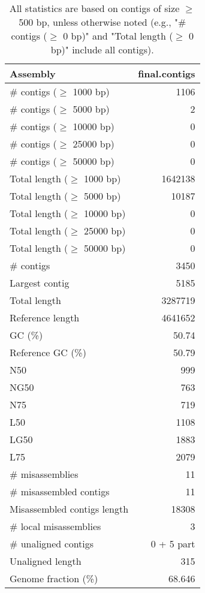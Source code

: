 \documentclass[12pt,a4paper]{article}
\begin{document}
\begin{table}[ht]
\begin{center}
\caption{All statistics are based on contigs of size $\geq$ 500 bp, unless otherwise noted (e.g., "\# contigs ($\geq$ 0 bp)" and "Total length ($\geq$ 0 bp)" include all contigs).}
\begin{tabular}{|l*{1}{|r}|}
\hline
Assembly & final.contigs \\ \hline
\# contigs ($\geq$ 1000 bp) & 1106 \\ \hline
\# contigs ($\geq$ 5000 bp) & 2 \\ \hline
\# contigs ($\geq$ 10000 bp) & 0 \\ \hline
\# contigs ($\geq$ 25000 bp) & 0 \\ \hline
\# contigs ($\geq$ 50000 bp) & 0 \\ \hline
Total length ($\geq$ 1000 bp) & 1642138 \\ \hline
Total length ($\geq$ 5000 bp) & 10187 \\ \hline
Total length ($\geq$ 10000 bp) & 0 \\ \hline
Total length ($\geq$ 25000 bp) & 0 \\ \hline
Total length ($\geq$ 50000 bp) & 0 \\ \hline
\# contigs & 3450 \\ \hline
Largest contig & 5185 \\ \hline
Total length & 3287719 \\ \hline
Reference length & 4641652 \\ \hline
GC (\%) & 50.74 \\ \hline
Reference GC (\%) & 50.79 \\ \hline
N50 & 999 \\ \hline
NG50 & 763 \\ \hline
N75 & 719 \\ \hline
L50 & 1108 \\ \hline
LG50 & 1883 \\ \hline
L75 & 2079 \\ \hline
\# misassemblies & 11 \\ \hline
\# misassembled contigs & 11 \\ \hline
Misassembled contigs length & 18308 \\ \hline
\# local misassemblies & 3 \\ \hline
\# unaligned contigs & 0 + 5 part \\ \hline
Unaligned length & 315 \\ \hline
Genome fraction (\%) & 68.646 \\ \hline

\end{tabular}
\end{center}
\end{table}
\end{document}
